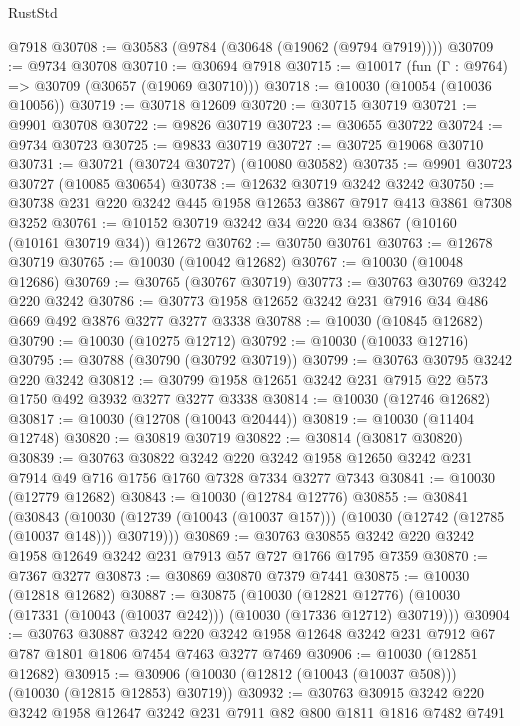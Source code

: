 \begin{lexlean}{RustStd}
\begin{coremodule}
    @7918
@30708 := @30583 (@9784 (@30648 (@19062 (@9794 @7919))))
@30709 := @9734 @30708
@30710 := @30694 @7918
@30715 := @10017 (fun (Γ : @9764) => @30709 (@30657 (@19069 @30710)))
@30718 := @10030 (@10054 (@10036 @10056))
@30719 := @30718 @12609
@30720 := @30715 @30719
@30721 := @9901 @30708
@30722 := @9826 @30719
@30723 := @30655 @30722
@30724 := @9734 @30723
@30725 := @9833 @30719
@30727 := @30725 @19068 @30710
@30731 := @30721 (@30724 @30727) (@10080 @30582)
@30735 := @9901 @30723 @30727 (@10085 @30654)
@30738 := @12632 @30719 @3242 @3242
@30750 := @30738 @231 @220 @3242 @445 @1958 @12653 @3867 @7917 @413 @3861 @7308 @3252
@30761 := @10152 @30719 @3242 @34 @220 @34 @3867 (@10160 (@10161 @30719 @34)) @12672
@30762 := @30750 @30761
@30763 := @12678 @30719
@30765 := @10030 (@10042 @12682)
@30767 := @10030 (@10048 @12686)
@30769 := @30765 (@30767 @30719)
@30773 := @30763 @30769 @3242 @220 @3242
@30786 := @30773 @1958 @12652 @3242 @231 @7916 @34 @486 @669 @492 @3876 @3277 @3277 @3338
@30788 := @10030 (@10845 @12682)
@30790 := @10030 (@10275 @12712)
@30792 := @10030 (@10033 @12716)
@30795 := @30788 (@30790 (@30792 @30719))
@30799 := @30763 @30795 @3242 @220 @3242
@30812 := @30799 @1958 @12651 @3242 @231 @7915 @22 @573 @1750 @492 @3932 @3277 @3277 @3338
@30814 := @10030 (@12746 @12682)
@30817 := @10030 (@12708 (@10043 @20444))
@30819 := @10030 (@11404 @12748)
@30820 := @30819 @30719
@30822 := @30814 (@30817 @30820)
@30839 := @30763
    @30822
    @3242
    @220
    @3242
    @1958
    @12650
    @3242
    @231
    @7914
    @49
    @716
    @1756
    @1760
    @7328
    @7334
    @3277
    @7343
@30841 := @10030 (@12779 @12682)
@30843 := @10030 (@12784 @12776)
@30855 := @30841
    (@30843
      (@10030 (@12739 (@10043 (@10037 @157))) (@10030 (@12742 (@12785 (@10037 @148))) @30719)))
@30869 := @30763 @30855 @3242 @220 @3242 @1958 @12649 @3242 @231 @7913 @57 @727 @1766 @1795 @7359
@30870 := @7367 @3277
@30873 := @30869 @30870 @7379 @7441
@30875 := @10030 (@12818 @12682)
@30887 := @30875
    (@10030
      (@12821 @12776)
      (@10030 (@17331 (@10043 (@10037 @242))) (@10030 (@17336 @12712) @30719)))
@30904 := @30763
    @30887
    @3242
    @220
    @3242
    @1958
    @12648
    @3242
    @231
    @7912
    @67
    @787
    @1801
    @1806
    @7454
    @7463
    @3277
    @7469
@30906 := @10030 (@12851 @12682)
@30915 := @30906 (@10030 (@12812 (@10043 (@10037 @508))) (@10030 (@12815 @12853) @30719))
@30932 := @30763
    @30915
    @3242
    @220
    @3242
    @1958
    @12647
    @3242
    @231
    @7911
    @82
    @800
    @1811
    @1816
    @7482
    @7491

\end{coremodule}
\end{lexlean}
